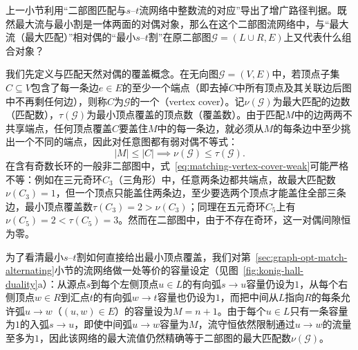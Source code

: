 上一小节利用“二部图匹配与$s$--$t$流网络中整数流的对应”导出了增广路径判据。既然最大流与最小割是一体两面的对偶对象，那么在这个二部图流网络中，与“最大流（最大匹配）”相对偶的“最小$s$--$t$割”在原二部图$\mathcal G=(L\cup R,E)$上又代表什么组合对象？

我们先定义与匹配天然对偶的覆盖概念。在无向图$\mathcal G=(V,E)$中，若顶点子集$C\subseteq V$包含了每一条边$e\in E$的至少一个端点（即去掉$C$中所有顶点及其关联边后图中不再剩任何边），则称$C$为$\mathcal G$的一个（vertex cover）。记$\nu(\mathcal G)$为最大匹配的边数（匹配数），$\tau(\mathcal G)$为最小顶点覆盖的顶点数（覆盖数）。由于匹配$M$中的边两两不共享端点，任何顶点覆盖$C$要盖住$M$中的每一条边，就必须从$M$的每条边中至少挑出一个不同的端点，因此对任意图都有弱对偶不等式：
\begin{equation}
  |M| \leq |C| \implies \nu(\mathcal G) \leq \tau(\mathcal G).
  \label{eq:matching-vertex-cover-weak}
\end{equation}
在含有奇数长环的一般非二部图中，式~\eqref{eq:matching-vertex-cover-weak}可能严格不等：例如在三元奇环$C_3$（三角形）中，任意两条边都共端点，故最大匹配数$\nu(C_3)=1$，但一个顶点只能盖住两条边，至少要选两个顶点才能盖住全部三条边，最小顶点覆盖数$\tau(C_3)=2>\nu(C_3)$；同理在五元奇环$C_5$上有$\nu(C_5)=2<\tau(C_5)=3$。然而在二部图中，由于不存在奇环，这一对偶间隙恒为零。

为了看清最小$s$--$t$割如何直接给出最小顶点覆盖，我们对第~\ref{sec:graph-opt-match-alternating}小节的流网络做一处等价的容量设定（见图~\ref{fig:konig-hall-duality}a）：从源点$s$到每个左侧顶点$u\in L$的有向弧$s\to u$容量仍设为$1$，从每个右侧顶点$w\in R$到汇点$t$的有向弧$w\to t$容量也仍设为$1$，而把中间从$L$指向$R$的每条允许弧$u\to w$（$(u,w)\in E$）的容量设为$M=n+1$。由于每个$u\in L$只有一条容量为$1$的入弧$s\to u$，即使中间弧$u\to w$容量为$M$，流守恒依然限制通过$u\to w$的流量至多为$1$，因此该网络的最大流值仍然精确等于二部图的最大匹配数$\nu(\mathcal G)$。

